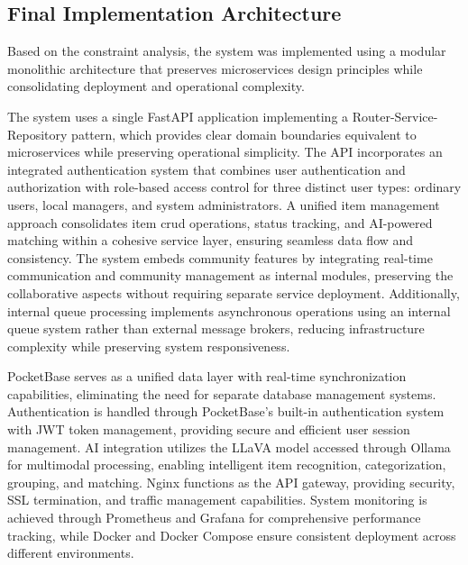 
\subsection{Final Implementation Architecture}

Based on the constraint analysis, the system was implemented using a modular monolithic architecture that preserves microservices design principles while consolidating deployment and operational complexity.

The system uses a single FastAPI application implementing a Router-Service-Repository pattern, which provides clear domain boundaries equivalent to microservices while preserving operational simplicity. The API incorporates an integrated authentication system that combines user authentication and authorization with role-based access control for three distinct user types: ordinary users, local managers, and system administrators. A unified item management approach consolidates item \ac{crud} operations, status tracking, and AI-powered matching within a cohesive service layer, ensuring seamless data flow and consistency. The system embeds community features by integrating real-time communication and community management as internal modules, preserving the collaborative aspects without requiring separate service deployment. Additionally, internal queue processing implements asynchronous operations using an internal queue system rather than external message brokers, reducing infrastructure complexity while preserving system responsiveness.

PocketBase serves as a unified data layer with real-time synchronization capabilities, eliminating the need for separate database management systems. Authentication is handled through PocketBase's built-in authentication system with JWT token management, providing secure and efficient user session management. AI integration utilizes the LLaVA model accessed through Ollama for multimodal processing, enabling intelligent item recognition, categorization, grouping, and matching. Nginx functions as the API gateway, providing security, SSL termination, and traffic management capabilities. System monitoring is achieved through Prometheus and Grafana for comprehensive performance tracking, while Docker and Docker Compose ensure consistent deployment across different environments.



